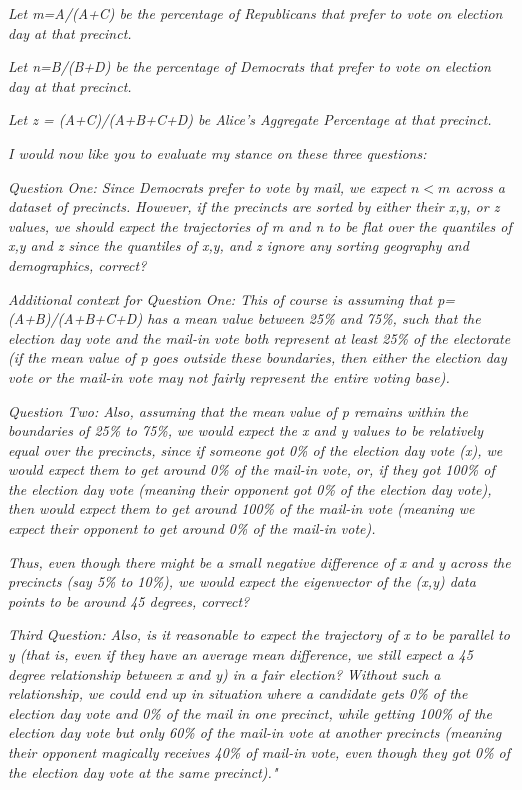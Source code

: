 \documentclass[preprint,13pt]{elsarticle}
\begin{document}
\textit{Let m=A/(A+C) be the percentage of Republicans that prefer to vote on election day at that precinct.}

\textit{Let n=B/(B+D) be the percentage of Democrats that prefer to vote on election day at that precinct.}

\textit{Let z = (A+C)/(A+B+C+D) be Alice's Aggregate Percentage at that precinct.}

\textit{I would now like you to evaluate my stance on these three questions:}

\textit{Question One: Since Democrats prefer to vote by mail, we expect $n<m$ across a dataset of precincts. However, if the precincts are sorted by either their x,y, or z values, we should expect the trajectories of m and n to be flat over the quantiles of x,y and z since the quantiles of x,y, and z ignore any sorting geography and demographics, correct?}

\textit{Additional context for Question One: This of course is assuming that p=(A+B)/(A+B+C+D) has a mean value between 25\% and 75\%, such that the election day vote and the mail-in vote both represent at least 25\% of the electorate (if the mean value of p goes outside these boundaries, then either the election day vote or the mail-in vote may not fairly represent the entire voting base).}

\textit{Question Two:  Also, assuming that the mean value of p remains within the boundaries of 25\% to 75\%, we would expect the x and y values to be relatively equal over the precincts, since if someone got 0\% of the election day vote (x), we would expect them to get around 0\% of the mail-in vote, or, if they got 100\% of the election day vote (meaning their opponent got 0\% of the election day vote), then would expect them to get around 100\% of the mail-in vote (meaning we expect their opponent to get around 0\% of the mail-in vote).}

\textit{Thus, even though there might be a small negative difference of x and y across the precincts (say 5\% to 10\%), we would expect the eigenvector of the (x,y) data points to be around 45 degrees, correct?}

\textit{Third Question: Also, is it reasonable to expect the trajectory of x to be parallel to y (that is, even if they have an average mean difference, we still expect a 45 degree relationship between x and y) in a fair election? Without such a relationship, we could end up in situation where a candidate gets 0\% of the election day vote and 0\% of the mail in one precinct, while getting 100\% of the election day vote but only 60\% of the mail-in vote at another precincts (meaning their opponent magically receives 40\% of mail-in vote, even though they got 0\% of the election day vote at the same precinct)."}
\end{document}

